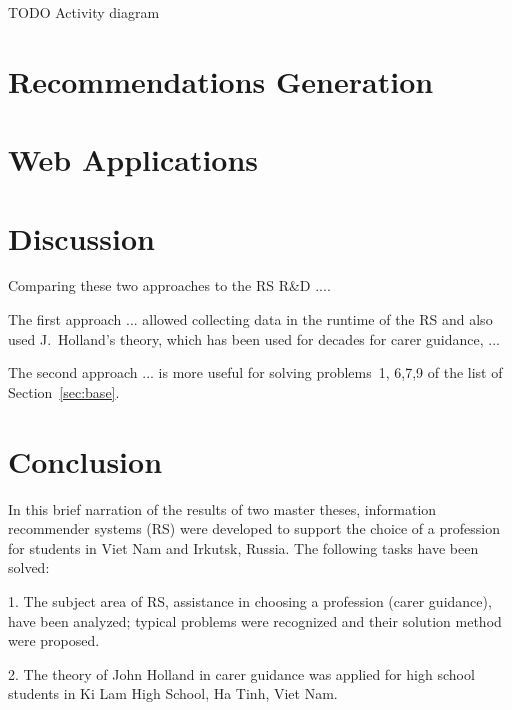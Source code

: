 \documentclass[conference,a4]{IEEEtran}
\begin{document}
TODO Activity diagram %

\section{Recommendations Generation}
\label{sec:proc-recs}






\section{Web Applications}

\section{Discussion}
\label{sec:disc}

Comparing these two approaches to the RS R\&D ....

The first approach ... allowed collecting data in the runtime of the RS and also used J.~Holland's theory, which has been used for decades for carer guidance, ...

The second approach ... is more useful for solving problems~1, 6,7,9 of the list of Section~\ref{sec:base}.



\section{Conclusion}
\label{sec:conc}


In this brief narration of the results of two master theses, information recommender systems (RS) were developed to support the choice of a profession for students in Viet Nam and Irkutsk, Russia. The following tasks have been solved:

1. The subject area of ​​RS, assistance in choosing a profession (carer guidance), have been analyzed; typical problems were recognized and their solution method were proposed.

2. The theory of John Holland in carer guidance was applied for high school students in Ki Lam High School, Ha Tinh, Viet Nam.
\end{document}
